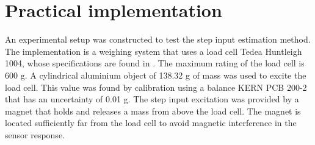 \section{Practical implementation} 
An experimental setup was constructed to test the step input estimation method.
The implementation is a weighing system that uses a load cell Tedea Huntleigh 1004, whose specifications are found in  \citet{tedea1004}.
The maximum rating of the load cell is 600 g.
A cylindrical aluminium object of 138.32 g of mass was used to excite the load cell.
This value was found by calibration using a balance KERN PCB 200-2 that has an uncertainty of 0.01 g.
The step input excitation was provided by a magnet that holds and releases a mass from above the load cell.
The magnet is located sufficiently far from the load cell to avoid magnetic interference in the sensor response.

